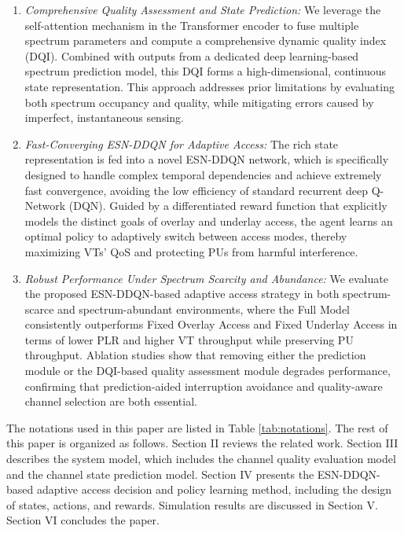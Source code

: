 \documentclass[journal]{IEEEtran}
\begin{document}
\begin{enumerate}[label=\arabic*)]
\item \textit{Comprehensive Quality Assessment and State Prediction:} We leverage the self-attention mechanism in the Transformer encoder to fuse multiple spectrum parameters and compute a comprehensive dynamic quality index (DQI). Combined with outputs from a dedicated deep learning-based spectrum prediction model, this DQI forms a high-dimensional, continuous state representation. This approach addresses prior limitations by evaluating both spectrum occupancy and quality, while mitigating errors caused by imperfect, instantaneous sensing.
\item \textit{Fast-Converging ESN-DDQN for Adaptive Access:} The rich state representation is fed into a novel ESN-DDQN network, which is specifically designed to handle complex temporal dependencies and achieve extremely fast convergence, avoiding the low efficiency of standard recurrent deep Q-Network (DQN). Guided by a differentiated reward function that explicitly models the distinct goals of overlay and underlay access, the agent learns an optimal policy to adaptively switch between access modes, thereby maximizing VTs’ QoS and protecting PUs from harmful interference.
\item\textit{Robust Performance Under Spectrum Scarcity and Abundance:} We evaluate the proposed ESN-DDQN-based adaptive access strategy in both spectrum-scarce and spectrum-abundant environments, where the Full Model consistently outperforms Fixed Overlay Access and Fixed Underlay Access in terms of lower PLR and higher VT throughput while preserving PU throughput. Ablation studies show that removing either the prediction module or the DQI-based quality assessment module degrades performance, confirming that prediction-aided interruption avoidance and quality-aware channel selection are both essential.
\end{enumerate}
\par The notations used in this paper are listed in Table \ref{tab:notations}. The rest of this paper is organized as follows. Section II reviews the related work. Section III describes the system model, which includes the channel quality evaluation model and the channel state prediction model. Section IV presents the ESN-DDQN-based adaptive access decision and policy learning method, including the design of states, actions, and rewards. Simulation results are discussed in Section V. Section VI concludes the paper.
\end{document}
